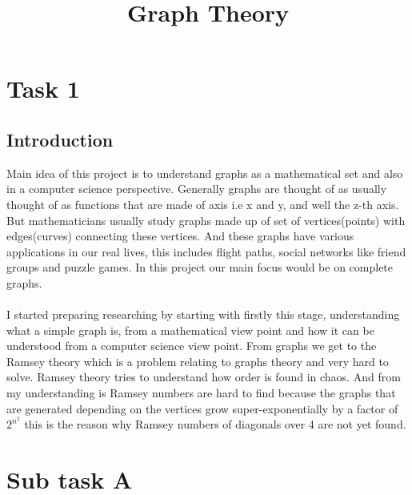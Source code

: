 \documentclass{Assignment}
\title{Graph Theory}
\begin{document}
\section*{Task 1}
\subsection*{Introduction}
Main idea of this project is to understand graphs  as a mathematical set and also in a computer science perspective. Generally graphs are thought of as usually thought of as functions that are made of axis i.e x and y, and well the z-th axis. But mathematicians usually study graphs made up of set of vertices(points) with edges(curves) connecting these vertices. And these graphs have various applications in our real lives, this includes flight paths, social networks like friend groups and puzzle games. In this project our main focus would be on complete graphs.\\
\\
 I started preparing researching by starting with firstly this stage, understanding what a simple graph is, from a mathematical view point and how it can be understood from a computer science view point. From graphs we get to the Ramsey theory which is a problem relating to graphs theory and very hard to solve. Ramsey theory tries to understand how order is found in chaos. And from my understanding is Ramsey numbers are hard to find because the graphs that are generated depending on the vertices grow super-exponentially by a factor of $2^{n^2}$ this is the reason why Ramsey numbers of diagonals over 4 are not yet found.\\
  
\section*{Sub task A}
\end{document}
